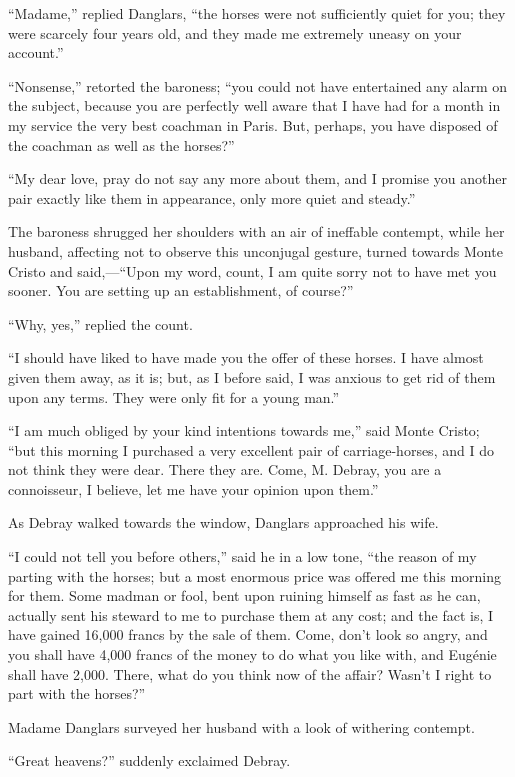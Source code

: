“Madame,” replied Danglars, “the horses were not sufficiently quiet for
you; they were scarcely four years old, and they made me extremely
uneasy on your account.”

“Nonsense,” retorted the baroness; “you could not have entertained any
alarm on the subject, because you are perfectly well aware that I have
had for a month in my service the very best coachman in Paris. But,
perhaps, you have disposed of the coachman as well as the horses?”

“My dear love, pray do not say any more about them, and I promise you
another pair exactly like them in appearance, only more quiet and
steady.”

The baroness shrugged her shoulders with an air of ineffable contempt,
while her husband, affecting not to observe this unconjugal gesture,
turned towards Monte Cristo and said,—“Upon my word, count, I am quite
sorry not to have met you sooner. You are setting up an establishment,
of course?”

“Why, yes,” replied the count.

“I should have liked to have made you the offer of these horses. I have
almost given them away, as it is; but, as I before said, I was anxious
to get rid of them upon any terms. They were only fit for a young man.”

“I am much obliged by your kind intentions towards me,” said Monte
Cristo; “but this morning I purchased a very excellent pair of
carriage-horses, and I do not think they were dear. There they are.
Come, M. Debray, you are a connoisseur, I believe, let me have your
opinion upon them.”

As Debray walked towards the window, Danglars approached his wife.

“I could not tell you before others,” said he in a low tone, “the
reason of my parting with the horses; but a most enormous price was
offered me this morning for them. Some madman or fool, bent upon
ruining himself as fast as he can, actually sent his steward to me to
purchase them at any cost; and the fact is, I have gained 16,000 francs
by the sale of them. Come, don’t look so angry, and you shall have
4,000 francs of the money to do what you like with, and Eugénie shall
have 2,000. There, what do you think now of the affair? Wasn’t I right
to part with the horses?”

Madame Danglars surveyed her husband with a look of withering contempt.

“Great heavens?” suddenly exclaimed Debray.

